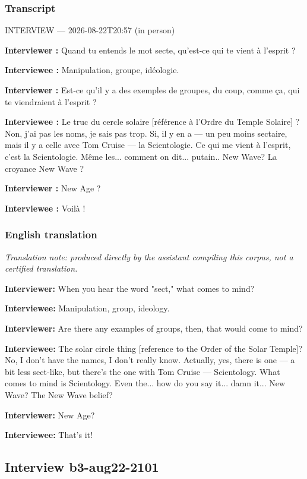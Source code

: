 \subsubsection*{Transcript}
\begin{otherlanguage}{french}
INTERVIEW — 2026-08-22T20:57 (in person)

\textbf{Interviewer :} Quand tu entends le mot secte, qu'est-ce qui te vient à l'esprit ?

\textbf{Interviewee :} Manipulation, groupe, idéologie.

\textbf{Interviewer :} Est-ce qu'il y a des exemples de groupes, du coup, comme ça, qui te viendraient à l'esprit ?

\textbf{Interviewee :} Le truc du cercle solaire [référence à l'Ordre du Temple Solaire] ? Non, j'ai pas les noms, je sais pas trop. Si, il y en a — un peu moins sectaire, mais il y a celle avec Tom Cruise — la Scientologie. Ce qui me vient à l'esprit, c'est la Scientologie. Même les... comment on dit... putain.. New Wave? La croyance New Wave ?

\textbf{Interviewer :} New Age ?

\textbf{Interviewee :} Voilà !
\end{otherlanguage}
\subsubsection*{English translation}
\textit{Translation note: produced directly by the assistant compiling this corpus, not a certified translation.}

\textbf{Interviewer:} When you hear the word "sect," what comes to mind?

\textbf{Interviewee:} Manipulation, group, ideology.

\textbf{Interviewer:} Are there any examples of groups, then, that would come to mind?

\textbf{Interviewee:} The solar circle thing [reference to the Order of the Solar Temple]? No, I don't have the names, I don't really know. Actually, yes, there is one — a bit less sect-like, but there's the one with Tom Cruise — Scientology. What comes to mind is Scientology. Even the... how do you say it... damn it... New Wave? The New Wave belief?

\textbf{Interviewer:} New Age?

\textbf{Interviewee:} That's it!

\subsection{Interview b3-aug22-2101}\label{int:b3-aug22-2101}
